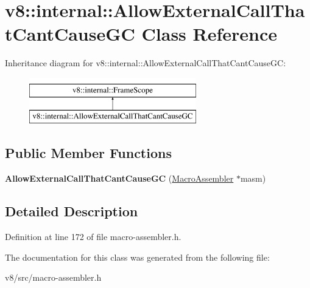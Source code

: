 \hypertarget{classv8_1_1internal_1_1AllowExternalCallThatCantCauseGC}{}\section{v8\+:\+:internal\+:\+:Allow\+External\+Call\+That\+Cant\+Cause\+GC Class Reference}
\label{classv8_1_1internal_1_1AllowExternalCallThatCantCauseGC}
Inheritance diagram for v8\+:\+:internal\+:\+:Allow\+External\+Call\+That\+Cant\+Cause\+GC\+:\begin{figure}[H]
\begin{center}
\leavevmode
\includegraphics[height=2.000000cm]{classv8_1_1internal_1_1AllowExternalCallThatCantCauseGC}
\end{center}
\end{figure}
\subsection*{Public Member Functions}
\begin{DoxyCompactItemize}
\item 
\mbox{\label{classv8_1_1internal_1_1AllowExternalCallThatCantCauseGC_ae136159f715f0afd4a7f76629f7bca48}} 
{\bfseries Allow\+External\+Call\+That\+Cant\+Cause\+GC} (\mbox{\hyperlink{classv8_1_1internal_1_1MacroAssembler}{Macro\+Assembler}} $\ast$masm)
\end{DoxyCompactItemize}


\subsection{Detailed Description}


Definition at line 172 of file macro-\/assembler.\+h.



The documentation for this class was generated from the following file\+:\begin{DoxyCompactItemize}
\item 
v8/src/macro-\/assembler.\+h\end{DoxyCompactItemize}
